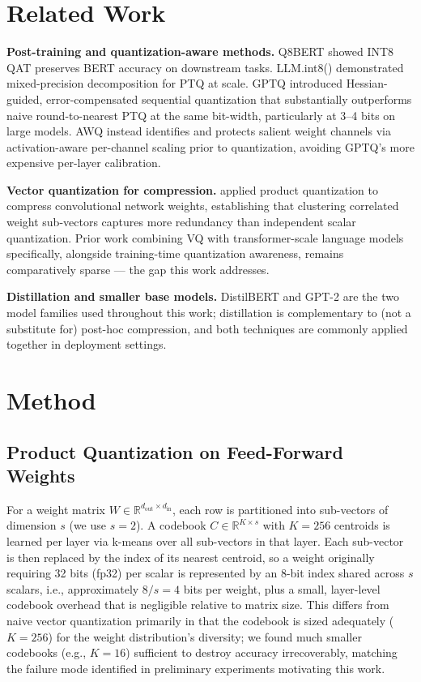 \documentclass[11pt]{article}
\begin{document}
\section{Related Work}

\textbf{Post-training and quantization-aware methods.} Q8BERT
\citep{zafrir2019q8bert} showed INT8 QAT preserves BERT accuracy on
downstream tasks. LLM.int8() \citep{dettmers2022bit8} demonstrated
mixed-precision decomposition for PTQ at scale. GPTQ
\citep{frantar2023gptq} introduced Hessian-guided, error-compensated
sequential quantization that substantially outperforms naive
round-to-nearest PTQ at the same bit-width, particularly at 3--4 bits on
large models. AWQ \citep{lin2024awq} instead identifies and protects
salient weight channels via activation-aware per-channel scaling prior to
quantization, avoiding GPTQ's more expensive per-layer calibration.

\textbf{Vector quantization for compression.} \citet{gong2014compressing}
applied product quantization to compress convolutional network weights,
establishing that clustering correlated weight sub-vectors captures more
redundancy than independent scalar quantization. Prior work combining VQ
with transformer-scale language models specifically, alongside
training-time quantization awareness, remains comparatively sparse --- the
gap this work addresses.

\textbf{Distillation and smaller base models.} DistilBERT
\citep{sanh2019distilbert} and GPT-2 \citep{radford2019gpt2} are the two
model families used throughout this work; distillation is complementary to
(not a substitute for) post-hoc compression, and both techniques are
commonly applied together in deployment settings.

\section{Method}

\subsection{Product Quantization on Feed-Forward Weights}

For a weight matrix $W \in \mathbb{R}^{d_{\text{out}} \times d_{\text{in}}}$,
each row is partitioned into sub-vectors of dimension $s$ (we use $s=2$).
A codebook $C \in \mathbb{R}^{K \times s}$ with $K=256$ centroids is learned
per layer via k-means over all sub-vectors in that layer. Each sub-vector is
then replaced by the index of its nearest centroid, so a weight originally
requiring 32 bits (fp32) per scalar is represented by an 8-bit index shared
across $s$ scalars, i.e., approximately $8/s = 4$ bits per weight, plus a
small, layer-level codebook overhead that is negligible relative to matrix
size. This differs from naive vector quantization primarily in that the
codebook is sized adequately ($K=256$) for the weight distribution's
diversity; we found much smaller codebooks (e.g., $K=16$) sufficient to
destroy accuracy irrecoverably, matching the failure mode identified in
preliminary experiments motivating this work.
\end{document}
